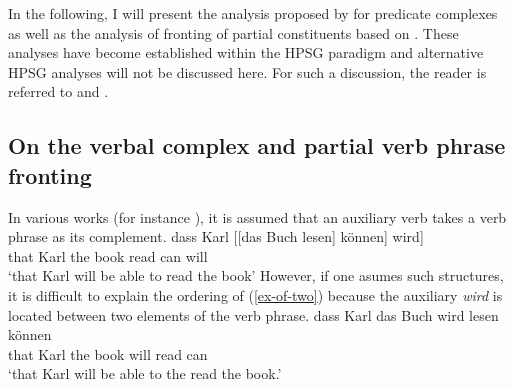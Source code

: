 In the following, I will present the analysis proposed by  for predicate complexes as well as the analysis of fronting of partial
constituents based on . These analyses have become established within the
HPSG paradigm and alternative HPSG analyses will not be discussed here.
For such a discussion, the reader is referred to  and .



%



\subsection{On the verbal complex and partial verb phrase fronting}
\label{sec-pred-compl}

In various works (for instance \citealp{Uszkoreit87a}), it is assumed that an
auxiliary verb takes a verb phrase as its complement.
\ea
\label{ex-uf-two}
\gll dass Karl [[das Buch lesen] können] wird]\\
	 that Karl the book read can will\\
\glt `that Karl will be able to read the book'
\z
However, if one asumes such structures, it is difficult to explain the ordering of (\ref{ex-of-two}) because the auxiliary \emph{wird} is located between two elements
of the verb phrase.
\ea
\label{ex-of-two}
\gll dass Karl das Buch wird lesen können\\
     that Karl the book will read can\\
\glt `that Karl will be able to the read the book.'
\z

